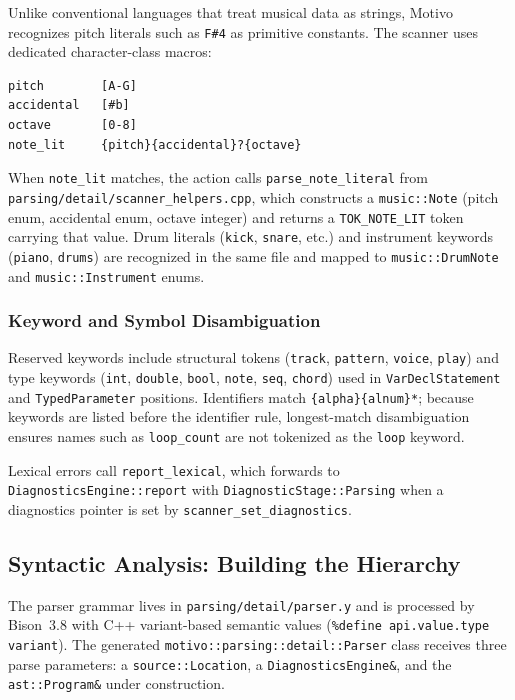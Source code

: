 Unlike conventional languages that treat musical data as strings, Motivo recognizes pitch literals such as
\texttt{F\#4} as primitive constants.
The scanner uses dedicated character-class macros:

\begin{lstlisting}[caption={Flex regular expression macros for note literal recognition (\texttt{scanner.l}).},label={detail-lst:scanner-note-macros}]
pitch        [A-G]
accidental   [#b]
octave       [0-8]
note_lit     {pitch}{accidental}?{octave}
\end{lstlisting}

When \texttt{note\_lit} matches, the action calls \texttt{parse\_note\_literal} from
\texttt{parsing/detail/scanner\_helpers.cpp}, which constructs a \texttt{music::Note} (pitch enum, accidental enum,
octave integer) and returns a \texttt{TOK\_NOTE\_LIT} token carrying that value.
Drum literals (\texttt{kick}, \texttt{snare}, etc.) and instrument keywords (\texttt{piano}, \texttt{drums}) are
recognized in the same file and mapped to \texttt{music::DrumNote} and \texttt{music::Instrument} enums.

\subsubsection{Keyword and Symbol Disambiguation}

Reserved keywords include structural tokens (\texttt{track}, \texttt{pattern}, \texttt{voice}, \texttt{play}) and
type keywords (\texttt{int}, \texttt{double}, \texttt{bool}, \texttt{note}, \texttt{seq}, \texttt{chord}) used in
\texttt{VarDeclStatement} and \texttt{TypedParameter} positions.
Identifiers match \texttt{\{alpha\}\{alnum\}*}; because keywords are listed before the identifier rule, longest-match
disambiguation ensures names such as \texttt{loop\_count} are not tokenized as the \texttt{loop} keyword.

Lexical errors call \texttt{report\_lexical}, which forwards to \texttt{DiagnosticsEngine::report} with
\texttt{DiagnosticStage::Parsing} when a diagnostics pointer is set by \texttt{scanner\_set\_diagnostics}.

\subsection{Syntactic Analysis: Building the Hierarchy}\label{detail-subsec:syntactic-analysis:-building-the-hierarchy}

The parser grammar lives in \texttt{parsing/detail/parser.y} and is processed by Bison~3.8 with C++ variant-based
semantic values (\texttt{\%define api.value.type variant}).
The generated \texttt{motivo::parsing::detail::Parser} class receives three parse parameters: a
\texttt{source::Location}, a \texttt{DiagnosticsEngine\&}, and the \texttt{ast::Program\&} under construction.

